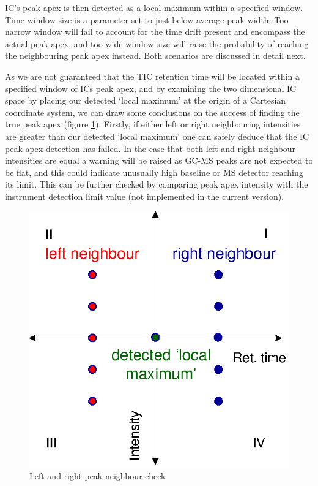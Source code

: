 IC’s peak apex is then detected as a local maximum within a specified window. 
Time window size is a parameter set to just below average peak width. Too narrow 
window will fail to account for the time drift present and encompass the actual 
peak apex, and too wide window size will raise the probability of reaching the 
neighbouring peak apex instead. Both scenarios are discussed in detail next. 

As we are not guaranteed that the TIC retention time will be located within a 
specified window of ICs peak apex, and by examining the two dimensional IC 
space by placing our detected ‘local maximum’ at the origin of a Cartesian 
coordinate system, we can draw some conclusions on the success of finding the 
true peak apex (figure \ref{fig:84}). Firstly, if either left or right
neighbouring intensities are greater than our detected ‘local maximum’ one
can safely deduce that the IC peak apex detection has failed. In the case
that both left and right neighbour intensities are equal a warning will
be raised as GC-MS peaks are not expected to be flat, and this could indicate
unusually high baseline or MS detector reaching its limit. This can be further 
checked by comparing peak apex intensity with the instrument detection limit 
value (not implemented in the current version).

\begin{figure}
  \begin{center}
    \includegraphics[scale=0.7]{graphics/chapter08/84.eps}
  \end{center}
  \caption{Left and right peak neighbour check}
  \label{fig:84}
\end{figure}

